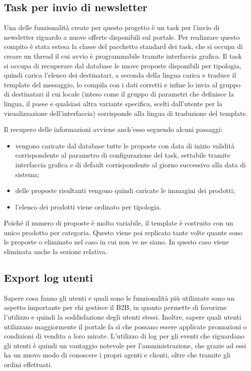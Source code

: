 \subsection{Task per invio di newsletter}
Una delle funzionalità create per questo progetto è un task per l'invio di newsletter riguardo a nuove offerte disponibili sul portale. Per realizzare questo compito è stata estesa la classe del pacchetto standard dei task, che si occupa di creare un thread il cui avvio è programmabile tramite interfaccia grafica. Il task si occupa di recuperare dal database le nuove proposte disponibili per tipologia, quindi carica l'elenco dei destinatari, a seconda della lingua carica e traduce il template del messaggio, lo compila con i dati corretti e infine lo invia al gruppo di destinatari il cui locale (inteso come il gruppo di parametri che definisce la lingua, il paese e qualsiasi altra variante specifica, scelti dall'utente per la visualizzazione dell'interfaccia) corrisponde alla lingua di traduzione del template.

Il recupero delle informazioni avviene anch'esso seguendo alcuni passaggi:
\begin{itemize}
	\item vengono caricate dal database tutte le proposte con data di inizio validità corrispondente al parametro di configurazione del task, settabile tramite interfaccia grafica e di default corrispondente al giorno successivo alla data di sistema;
	\item delle proposte risultanti vengono quindi caricate le immagini dei prodotti;
	\item l'elenco dei prodotti viene ordinato per tipologia.
\end{itemize}
Poiché il numero di proposte è molto variabile, il template è costruito con un unico prodotto per categoria. Questo viene poi replicato tante volte quante sono le proposte o eliminato nel caso in cui non ve ne siano. In questo caso viene eliminata anche la sezione relativa.


\subsection{Export log utenti}
Sapere cosa fanno gli utenti e quali sono le funzionalità più utilizzate sono un aspetto importante per chi gestisce il B2B, in quanto permette di favorirne l'utilizzo e quindi la soddisfazione degli utenti stessi. Inoltre, sapere quali utenti utilizzano maggiormente il portale fa sì che possano essere applicate promozioni o condizioni di vendita a loro mirate. L'utilizzo di log per gli eventi che riguardano gli utenti è quindi un vantaggio notevole per l'amministrazione, che grazie ad essi ha un nuovo modo di conoscere i propri agenti e clienti, oltre che tramite gli ordini effettuati.

